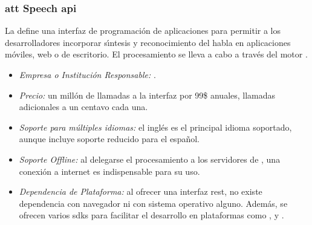 \subsubsection{\gls{att} Speech \gls{api}}
\label{sec:att}

La  \cite{AttSpeech} define una interfaz de programaci\'on de aplicaciones para permitir
a los desarrolladores incorporar s{\'\i}ntesis y reconocimiento del habla en aplicaciones m\'oviles,
web o de escritorio. El procesamiento se lleva a cabo a trav\'es del motor .

\begin{itemize}
	\item \emph{Empresa o Instituci\'on Responsable:} .
	\item \emph{Precio:} un mill\'on de llamadas a la interfaz por 99\$ anuales, llamadas adicionales a un centavo
	cada una.
	\item \emph{Soporte para m\'ultiples idiomas:} el ingl\'es es el principal idioma soportado, aunque incluye
	soporte reducido para el espa\~nol.
	\item \emph{Soporte Offline:} al delegarse el procesamiento a los servidores de ,
	una conexi\'on a internet es indispensable para su uso.
	\item \emph{Dependencia de Plataforma:} al ofrecer una interfaz \gls{rest}, no existe dependencia con navegador
	ni con sistema operativo alguno. Adem\'as, se ofrecen varios \gls{sdk}s para facilitar
	el desarrollo en plataformas como ,  y .
\end{itemize}
